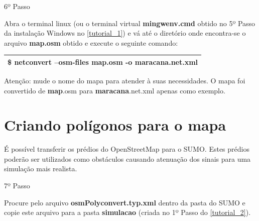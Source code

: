 \documentclass[
12pt,				%
openright,			%
oneside,			%
a4paper,			%
brazil,				%
]{abntex2}
\begin{document}
{\begin{anexosenv}

            	\begin{description}
                    \item[6º Passo]
                \end{description}
                \par Abra o terminal linux (ou o terminal virtual \textbf{mingwenv.cmd} obtido no 5º Passo da instalação Windows no \autoref{tutorial_1}) e vá até o diretório onde encontra-se o arquivo \textbf{map.osm} obtido e execute o seguinte comando: %
		
	            \begin{table}[H]
		            \renewcommand{\arraystretch}{1.5}
	                \begin{tabular}{|p{15.5cm}|}
		                \hline
                        \$ netconvert --osm-files \textbf{map}.osm -o \textbf{maracana}.net.xml \\
		                \hline
		            \end{tabular}
	            \end{table}
	            
	            \par Atenção: mude o nome do mapa para atender à suas necessidades. O mapa foi convertido de \textbf{map}.osm para \textbf{maracana}.net.xml apenas como exemplo.
            
        	\section{Criando polígonos para o mapa}
        	
            	\par É possível transferir os prédios do OpenStreetMap para o SUMO. Estes prédios poderão ser utilizados como obstáculos causando atenuação dos sinais para uma simulação mais realista.
                    

            	\begin{description}
                    \item[7º Passo]
                \end{description}
                \par Procure pelo arquivo \textbf{osmPolyconvert.typ.xml} dentro da pasta do SUMO e copie este arquivo para a pasta \textbf{simulacao} (criada no 1º Passo do \autoref{tutorial_2}). %
                

\end{anexosenv}}
\end{document}
